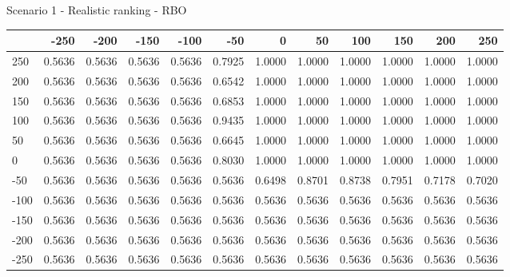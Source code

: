 Scenario 1 - Realistic ranking - RBO
\begin{tabular}{lrrrrrrrrrrr}
\toprule
{} &   -250 &   -200 &   -150 &   -100 &   -50  &    0   &    50  &    100 &    150 &    200 &    250 \\
\midrule
 250 & 0.5636 & 0.5636 & 0.5636 & 0.5636 & 0.7925 & 1.0000 & 1.0000 & 1.0000 & 1.0000 & 1.0000 & 1.0000 \\
 200 & 0.5636 & 0.5636 & 0.5636 & 0.5636 & 0.6542 & 1.0000 & 1.0000 & 1.0000 & 1.0000 & 1.0000 & 1.0000 \\
 150 & 0.5636 & 0.5636 & 0.5636 & 0.5636 & 0.6853 & 1.0000 & 1.0000 & 1.0000 & 1.0000 & 1.0000 & 1.0000 \\
 100 & 0.5636 & 0.5636 & 0.5636 & 0.5636 & 0.9435 & 1.0000 & 1.0000 & 1.0000 & 1.0000 & 1.0000 & 1.0000 \\
 50  & 0.5636 & 0.5636 & 0.5636 & 0.5636 & 0.6645 & 1.0000 & 1.0000 & 1.0000 & 1.0000 & 1.0000 & 1.0000 \\
 0   & 0.5636 & 0.5636 & 0.5636 & 0.5636 & 0.8030 & 1.0000 & 1.0000 & 1.0000 & 1.0000 & 1.0000 & 1.0000 \\
-50  & 0.5636 & 0.5636 & 0.5636 & 0.5636 & 0.5636 & 0.6498 & 0.8701 & 0.8738 & 0.7951 & 0.7178 & 0.7020 \\
-100 & 0.5636 & 0.5636 & 0.5636 & 0.5636 & 0.5636 & 0.5636 & 0.5636 & 0.5636 & 0.5636 & 0.5636 & 0.5636 \\
-150 & 0.5636 & 0.5636 & 0.5636 & 0.5636 & 0.5636 & 0.5636 & 0.5636 & 0.5636 & 0.5636 & 0.5636 & 0.5636 \\
-200 & 0.5636 & 0.5636 & 0.5636 & 0.5636 & 0.5636 & 0.5636 & 0.5636 & 0.5636 & 0.5636 & 0.5636 & 0.5636 \\
-250 & 0.5636 & 0.5636 & 0.5636 & 0.5636 & 0.5636 & 0.5636 & 0.5636 & 0.5636 & 0.5636 & 0.5636 & 0.5636 \\
\bottomrule
\end{tabular}

